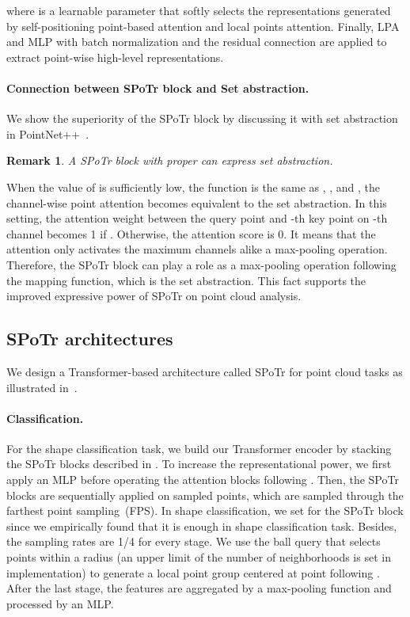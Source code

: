 \documentclass[10pt,twocolumn,letterpaper]{article}
\newtheorem{remark}{Remark}
\begin{document}
where  is a learnable parameter that softly selects the representations generated by self-positioning point-based attention and local points attention.
Finally, LPA and MLP with batch normalization and the residual connection are applied to extract point-wise high-level representations.

\paragraph{Connection between SPoTr block and Set abstraction.}
We show the superiority of the SPoTr block by discussing it with set abstraction in PointNet++~\cite{qi2017pointnet++}. 
\begin{remark}
A SPoTr block with proper  can express set abstraction.
\end{remark}
When the value of  is sufficiently low, the function  is the same as , , and , the channel-wise point attention becomes equivalent to the set abstraction.   
In this setting, the attention weight between the query point and -th key point on -th channel becomes 1 if .
Otherwise, the attention score is 0.
It means that the attention only activates the maximum channels alike a max-pooling operation. 
Therefore, the SPoTr block can play a role as a max-pooling operation following the mapping function, which is the set abstraction.
This fact supports the improved expressive power of SPoTr on point cloud analysis.


     \subsection{SPoTr architectures}
    \label{sec:3.4}

We design a Transformer-based architecture called SPoTr for point cloud tasks as illustrated in~. 


\paragraph{Classification.}
For the shape classification task, we build our Transformer encoder by stacking the SPoTr blocks  described in .
To increase the representational power, we first apply an MLP before operating the attention blocks following \cite{zhao2021point}.
Then, the SPoTr blocks are sequentially applied on sampled points, which are sampled through the farthest point sampling~(FPS).
In shape classification, we set  for the SPoTr block since we empirically found that it is enough in shape classification task.
Besides, the sampling rates are 1/4 for every stage.
We use the ball query that selects points within a radius (an upper limit of the number of neighborhoods is set in implementation) to generate a local point group  centered at point  following \cite{qi2017pointnet++}.
After the last stage, the features are aggregated by a max-pooling function and processed by an MLP.
\end{document}
